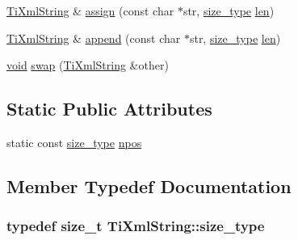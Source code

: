 \begin{DoxyCompactItemize}
\item 
\hyperlink{class_ti_xml_string}{Ti\-Xml\-String} \& \hyperlink{class_ti_xml_string_afe4cd3452ccd7cd8c8cac16e24ea28d7}{assign} (const char $\ast$str, \hyperlink{class_ti_xml_string_abeb2c1893a04c17904f7c06546d0b971}{size\-\_\-type} \hyperlink{glew_8h_a652168017ea9a8bbcead03d5c16269fb}{len})
\item 
\hyperlink{class_ti_xml_string}{Ti\-Xml\-String} \& \hyperlink{class_ti_xml_string_a717b00190c8acdee94816d2f4f20e75a}{append} (const char $\ast$str, \hyperlink{class_ti_xml_string_abeb2c1893a04c17904f7c06546d0b971}{size\-\_\-type} \hyperlink{glew_8h_a652168017ea9a8bbcead03d5c16269fb}{len})
\item 
\hyperlink{wglew_8h_aeea6e3dfae3acf232096f57d2d57f084}{void} \hyperlink{class_ti_xml_string_aa392cbc180752a79f007f4f9280c7762}{swap} (\hyperlink{class_ti_xml_string}{Ti\-Xml\-String} \&other)
\end{DoxyCompactItemize}
\subsection*{Static Public Attributes}
\begin{DoxyCompactItemize}
\item 
static const \hyperlink{class_ti_xml_string_abeb2c1893a04c17904f7c06546d0b971}{size\-\_\-type} \hyperlink{class_ti_xml_string_a1aa6260982d3a63f0c822fe40fd7b37f}{npos}
\end{DoxyCompactItemize}


\subsection{Member Typedef Documentation}
\hypertarget{class_ti_xml_string_abeb2c1893a04c17904f7c06546d0b971}{
\subsubsection[{size\-\_\-type}]{\setlength{\rightskip}{0pt plus 5cm}typedef size\-\_\-t {\bf Ti\-Xml\-String\-::size\-\_\-type}}}\label{class_ti_xml_string_abeb2c1893a04c17904f7c06546d0b971}


